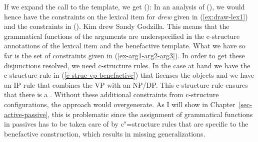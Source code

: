If we expand the call to the  template, we get ():
\ea
{}
\z
In an analysis of (), we would hence have the constraints on the lexical item for \emph{drew}
given in (\ref{ex:draw-lex1}) and the constraints in ().
\ea
Kim drew Sandy Godzilla.
\z
This means that the grammatical functions of the arguments are underspecified in the c-structure annotations of the lexical item and
the benefactive template. What we have so far is the set of constraints given in
(\ref{ex-arg1-arg2-arg3}). In order to get these disjunctions
resolved\label{page-disjunctions-gf-c-structure}, 
we need c-structure rules. In the case at hand we have the c-structure rule in (\ref{c-struc-vp-benefactive}) that
licenses the objects and we have an IP rule that combines the VP with an NP/DP. This c-structure
rule ensures that there is a \subjlfg. Without these additional constraints from c-structure
configurations, the approach would overgenerate. As I will show in Chapter~\ref{sec-active-passive}, this is
problematic since the assignment of grammatical functions in passives has to be taken care of by
c"=structure rules that are specific to the benefactive construction, which results in missing
generalizations.

